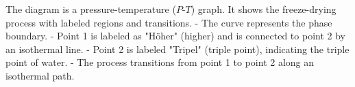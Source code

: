 The diagram is a pressure-temperature (\(P\)-\(T\)) graph. It shows the freeze-drying process with labeled regions and transitions.  
- The curve represents the phase boundary.  
- Point 1 is labeled as "Höher" (higher) and is connected to point 2 by an isothermal line.  
- Point 2 is labeled "Tripel" (triple point), indicating the triple point of water.  
- The process transitions from point 1 to point 2 along an isothermal path.